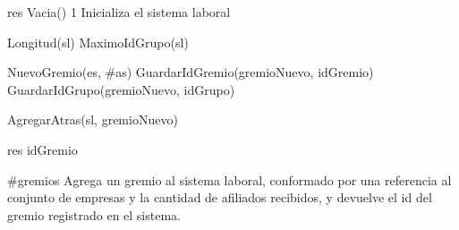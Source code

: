 {
	\state res \asig Vacia()								
}
{1}
{Inicializa el sistema laboral}

{	
	\state {} \asig Longitud(sl) 								
	\state {} \asig MaximoIdGrupo(sl) 							
	\state

	\state {} \asig NuevoGremio(es, \#as) 				
	\state GuardarIdGremio(gremioNuevo, idGremio) 									
	\state GuardarIdGrupo(gremioNuevo, idGrupo) 										
	\state

	\state AgregarAtras(sl, gremioNuevo) 										
	\state

	\state res \asig idGremio 														
}
{\#gremios}
{Agrega un gremio al sistema laboral, conformado por una referencia al conjunto de empresas y la cantidad de afiliados recibidos, y devuelve el id del gremio registrado en el sistema.}


